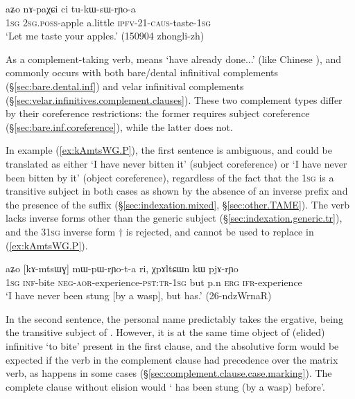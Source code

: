 \begin{exe}
\ex \label{ex:tukWsWrYoa}
 \gll aʑo nɤ-paχɕi ci tu-kɯ-sɯ-rɲo-a \\
 \textsc{1sg} \textsc{2sg}.\textsc{poss}-apple a.little \textsc{ipfv}-2\fl{}1-\textsc{caus}-taste-\textsc{1sg} \\
 \glt `Let me taste your apples.' (150904 zhongli-zh)
\end{exe}    
    
As a com\-ple\-ment-taking verb,  means `have already done...' (like Chinese  ), and commonly occurs with both bare/dental infinitival complements (§\ref{sec:bare.dental.inf}) and velar infinitival complements (§\ref{sec:velar.infinitives.complement.clauses}). These two complement types differ by their coreference restrictions: the former requires subject coreference (§\ref{sec:bare.inf.coreference}), while the latter does not.


In example (\ref{ex:kAmtsWG.P}), the first sentence  is ambiguous, and could be translated as either `I have never bitten it' (subject coreference) or `I have never been bitten by it' (object coreference), regardless of the fact that the \textsc{1sg} is a transitive subject in both cases as shown by the absence of an inverse prefix and the presence of the  suffix (§\ref{sec:indexation.mixed}, §\ref{sec:other.TAME}). The verb  lacks inverse forms other than the generic subject (§\ref{sec:indexation.generic.tr}), and the 3\fl{}\textsc{1sg} inverse form $\dagger$ is rejected, and cannot be used to replace   in (\ref{ex:kAmtsWG.P}).

\begin{exe}
\ex   \label{ex:kAmtsWG.P} 
\gll aʑo [kɤ-mtsɯɣ] mɯ-pɯ-rɲo-t-a ri, χpɤltɕɯn kɯ pjɤ-rɲo  \\
\textsc{1sg} \textsc{inf}-bite \textsc{neg}-\textsc{aor}-experience-\textsc{pst}:\textsc{tr}-\textsc{1sg} but p.n \textsc{erg}  \textsc{ifr}-experience \\
\glt `I have never been stung [by a wasp], but  has.' (26-ndzWrnaR) 
\end{exe}  

 
In the second sentence, the personal name  predictably takes the ergative, being the transitive subject of . However, it is at the same time object of (elided) infinitive  `to bite' present in the first clause, and the absolutive form would be expected if the verb in the complement clause had precedence over the matrix verb, as happens in some cases (§\ref{sec:complement.clause.case.marking}). The complete clause without elision would  ` has been stung (by a wasp) before'.


